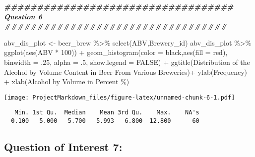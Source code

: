 \documentclass[
]{article}
\newenvironment{Shaded}{\begin{snugshade}}{\end{snugshade}}
\newcommand{\AttributeTok}[1]{\textcolor[rgb]{0.77,0.63,0.00}{#1}}
\newcommand{\ConstantTok}[1]{\textcolor[rgb]{0.00,0.00,0.00}{#1}}
\newcommand{\DecValTok}[1]{\textcolor[rgb]{0.00,0.00,0.81}{#1}}
\newcommand{\DocumentationTok}[1]{\textcolor[rgb]{0.56,0.35,0.01}{\textbf{\textit{#1}}}}
\newcommand{\FunctionTok}[1]{\textcolor[rgb]{0.00,0.00,0.00}{#1}}
\newcommand{\NormalTok}[1]{#1}
\newcommand{\OtherTok}[1]{\textcolor[rgb]{0.56,0.35,0.01}{#1}}
\newcommand{\SpecialCharTok}[1]{\textcolor[rgb]{0.00,0.00,0.00}{#1}}
\newcommand{\StringTok}[1]{\textcolor[rgb]{0.31,0.60,0.02}{#1}}
\begin{document}
\begin{Shaded}
\begin{Highlighting}[]
\DocumentationTok{\#\#\#\#\#\#\#\#\#\#\#\#\#\#\#\#\#\#\#\#\#\#\#\#\#\#\#\#\#\#\#\#\#\#\# Question 6 \#\#\#\#\#\#\#\#\#\#\#\#\#\#\#\#\#\#\#\#\#\#\#\#\#\#\#\#\#\#\#\#\#\#}

\NormalTok{abv\_dis\_plot }\OtherTok{\textless{}{-}}\NormalTok{ beer\_brew }\SpecialCharTok{\%\textgreater{}\%} \FunctionTok{select}\NormalTok{(ABV,Brewery\_id)}
\NormalTok{abv\_dis\_plot }\SpecialCharTok{\%\textgreater{}\%} \FunctionTok{ggplot}\NormalTok{(}\FunctionTok{aes}\NormalTok{(ABV }\SpecialCharTok{*} \DecValTok{100}\NormalTok{)) }\SpecialCharTok{+}
  \FunctionTok{geom\_histogram}\NormalTok{(}\AttributeTok{color =} \StringTok{\textquotesingle{}black\textquotesingle{}}\NormalTok{,}\FunctionTok{aes}\NormalTok{(}\AttributeTok{fill =} \StringTok{\textquotesingle{}red\textquotesingle{}}\NormalTok{), }\AttributeTok{binwidth =}\NormalTok{ .}\DecValTok{25}\NormalTok{, }\AttributeTok{alpha =}\NormalTok{ .}\DecValTok{5}\NormalTok{, }\AttributeTok{show.legend =} \ConstantTok{FALSE}\NormalTok{) }\SpecialCharTok{+}
  \FunctionTok{ggtitle}\NormalTok{(}\StringTok{\textquotesingle{}Distribution of the Alcohol by Volume Content in Beer From Various Breweries\textquotesingle{}}\NormalTok{)}\SpecialCharTok{+}
  \FunctionTok{ylab}\NormalTok{(}\StringTok{\textquotesingle{}Frequency\textquotesingle{}}\NormalTok{) }\SpecialCharTok{+} \FunctionTok{xlab}\NormalTok{(}\StringTok{\textquotesingle{}Alcohol by Volume in Percent \%\textquotesingle{}}\NormalTok{)}
\end{Highlighting}
\end{Shaded}

\texttt{[image: ProjectMarkdown\_files/figure-latex/unnamed-chunk-6-1.pdf]}

\begin{Shaded}
\end{Shaded}

\begin{verbatim}
   Min. 1st Qu.  Median    Mean 3rd Qu.    Max.    NA's 
  0.100   5.000   5.700   5.993   6.800  12.800      60 
\end{verbatim}

\hypertarget{question-of-interest-7}{%
\subsection{Question of Interest 7:}\label{question-of-interest-7}}
\end{document}
